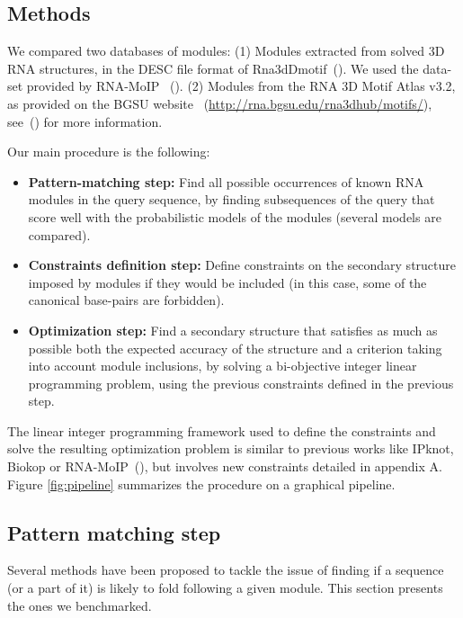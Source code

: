 \documentclass{bioinfo}
\begin{document}
\begin{methods}
\section{Methods}\label{sec:methods}
We  compared two databases of modules: (1) Modules extracted from solved 3D RNA structures, in the DESC file format of Rna3dDmotif~(\citealp{djelloul_automated_2008}). We used the data-set provided by RNA-MoIP ~(\citealp{djelloul_automated_2008,reinharz_towards_2012}). (2) Modules from the RNA 3D Motif Atlas v3.2, as provided on the BGSU website ~(\href{http://rna.bgsu.edu/rna3dhub/motifs/}{http://rna.bgsu.edu/rna3dhub/motifs/}), see~(\citealp{petrov_automated_2013}) for more information.

Our main procedure is the following:
\begin{itemize}
\item \textbf{Pattern-matching step:} Find all possible occurrences of known RNA modules in the query sequence, by finding subsequences of the query that score well with the probabilistic models of the modules (several models are compared).
\item \textbf{Constraints definition step:} Define constraints on the secondary structure imposed by modules if they would be included (in this case, some of the canonical base-pairs are forbidden).
 \item \textbf{Optimization step:} Find a secondary structure that satisfies as much as possible both the expected accuracy of the structure and a criterion taking into account module inclusions, by solving a bi-objective integer linear programming problem, using the previous constraints defined in the previous step.
\end{itemize}
  
The linear integer programming framework used to define the constraints and solve the resulting optimization problem is similar to previous works like IPknot, Biokop or RNA-MoIP~(\citealp{sato_ipknot:_2011,legendre_bi-objective_2018,reinharz_towards_2012}), but involves new constraints detailed in appendix A. 
Figure \ref{fig:pipeline} summarizes the procedure on a graphical pipeline.
   
\subsection{Pattern matching step}\label{sec:models}
Several methods have been proposed to tackle the issue of finding if a sequence (or a part of it) is likely to fold following a given module. This section presents the ones we benchmarked.


\end{methods}
\end{document}
